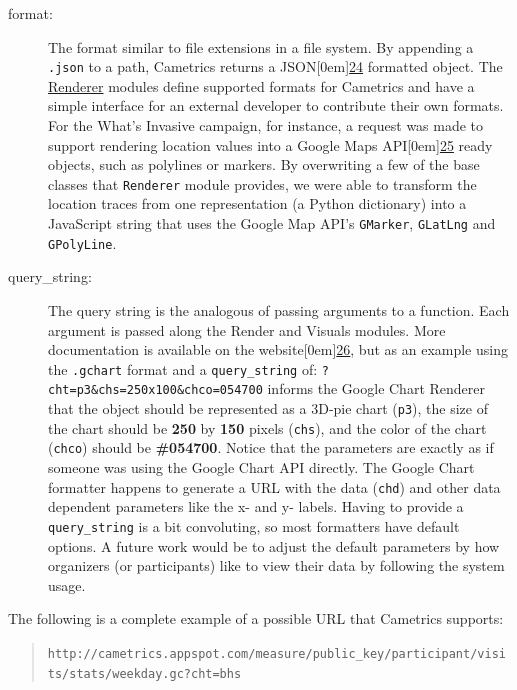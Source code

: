 \documentclass[10pt,a4paper,english]{article}
\begin{document}
\begin{description}
\item[{format:}] \leavevmode 
The format similar to file extensions in a file system. By appending a \texttt{.json} to a path, Cametrics returns a JSON\raisebox{.5em}[0em]{\scriptsize\hyperlink{id52}{24}} formatted object. The \href{\#renderer}{Renderer} modules define supported formats for Cametrics and have a simple interface for an external developer to contribute their own formats. For the What's Invasive campaign, for instance, a request was made to support rendering location values into a Google Maps API\raisebox{.5em}[0em]{\scriptsize\hyperlink{id53}{25}} ready objects, such as polylines or markers. By overwriting a few of the base classes that \texttt{Renderer} module provides, we were able to transform the location traces from one representation (a Python dictionary) into a JavaScript string that uses the Google Map API's \texttt{GMarker}, \texttt{GLatLng} and \texttt{GPolyLine}.

\item[{query{\_}string:}] \leavevmode 
The query string is the analogous of passing arguments to a function. Each argument is passed along the Render and Visuals modules. More documentation is available on the website\raisebox{.5em}[0em]{\scriptsize\hyperlink{id55}{26}}, but as an example using the \texttt{.gchart} format and a \texttt{query{\_}string} of: \texttt{?cht=p3{\&}chs=250x100{\&}chco=054700} informs the Google Chart Renderer that the object should be represented as a 3D-pie chart (\texttt{p3}), the size of the chart should be \textbf{250} by \textbf{150} pixels (\texttt{chs}), and the color of the chart (\texttt{chco}) should be \textbf{{\#}054700}. Notice that the parameters are exactly as if someone was using the Google Chart API directly. The Google Chart formatter happens to generate a URL with the data (\texttt{chd}) and other data dependent parameters like the x- and y- labels. Having to provide a \texttt{query{\_}string} is a bit convoluting, so most formatters have default options. A future work would be to adjust the default parameters by how organizers (or participants) like to view their data by following the system usage.

\end{description}

The following is a complete example of a possible URL that Cametrics supports:
\begin{quote}

\texttt{http://cametrics.appspot.com/measure/public{\_}key/participant/visits/stats/weekday.gc?cht=bhs}
\end{quote}
\end{document}
